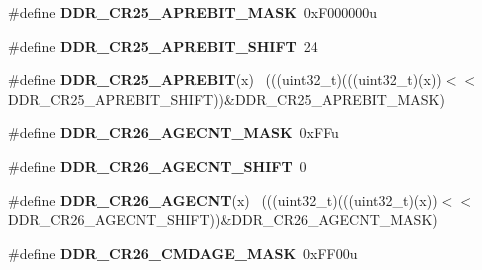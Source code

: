 \begin{DoxyCompactItemize}
\item 
\hypertarget{group___d_d_r___register___masks_gae51a88f26be259a9f86bcb1b56386788}{}\#define {\bfseries D\+D\+R\+\_\+\+C\+R25\+\_\+\+A\+P\+R\+E\+B\+I\+T\+\_\+\+M\+A\+S\+K}~0x\+F000000u\label{group___d_d_r___register___masks_gae51a88f26be259a9f86bcb1b56386788}

\item 
\hypertarget{group___d_d_r___register___masks_ga7a557a1fb1705029b7e43ccd5a9920db}{}\#define {\bfseries D\+D\+R\+\_\+\+C\+R25\+\_\+\+A\+P\+R\+E\+B\+I\+T\+\_\+\+S\+H\+I\+F\+T}~24\label{group___d_d_r___register___masks_ga7a557a1fb1705029b7e43ccd5a9920db}

\item 
\hypertarget{group___d_d_r___register___masks_ga47633c27abd8838b734e1d5cd5e342d8}{}\#define {\bfseries D\+D\+R\+\_\+\+C\+R25\+\_\+\+A\+P\+R\+E\+B\+I\+T}(x)                                        ~(((uint32\+\_\+t)(((uint32\+\_\+t)(x))$<$$<$D\+D\+R\+\_\+\+C\+R25\+\_\+\+A\+P\+R\+E\+B\+I\+T\+\_\+\+S\+H\+I\+F\+T))\&D\+D\+R\+\_\+\+C\+R25\+\_\+\+A\+P\+R\+E\+B\+I\+T\+\_\+\+M\+A\+S\+K)\label{group___d_d_r___register___masks_ga47633c27abd8838b734e1d5cd5e342d8}

\item 
\hypertarget{group___d_d_r___register___masks_gab569c7ca0823bb66ee02ad5b40c29e37}{}\#define {\bfseries D\+D\+R\+\_\+\+C\+R26\+\_\+\+A\+G\+E\+C\+N\+T\+\_\+\+M\+A\+S\+K}~0x\+F\+Fu\label{group___d_d_r___register___masks_gab569c7ca0823bb66ee02ad5b40c29e37}

\item 
\hypertarget{group___d_d_r___register___masks_gaa552705cd467d0a21c96806bdade9cba}{}\#define {\bfseries D\+D\+R\+\_\+\+C\+R26\+\_\+\+A\+G\+E\+C\+N\+T\+\_\+\+S\+H\+I\+F\+T}~0\label{group___d_d_r___register___masks_gaa552705cd467d0a21c96806bdade9cba}

\item 
\hypertarget{group___d_d_r___register___masks_gaf3b9cac000cb4127f45ee04ba57a29a2}{}\#define {\bfseries D\+D\+R\+\_\+\+C\+R26\+\_\+\+A\+G\+E\+C\+N\+T}(x)                                          ~(((uint32\+\_\+t)(((uint32\+\_\+t)(x))$<$$<$D\+D\+R\+\_\+\+C\+R26\+\_\+\+A\+G\+E\+C\+N\+T\+\_\+\+S\+H\+I\+F\+T))\&D\+D\+R\+\_\+\+C\+R26\+\_\+\+A\+G\+E\+C\+N\+T\+\_\+\+M\+A\+S\+K)\label{group___d_d_r___register___masks_gaf3b9cac000cb4127f45ee04ba57a29a2}

\item 
\hypertarget{group___d_d_r___register___masks_gafb7aeb4b9ce030c5165829df8d589316}{}\#define {\bfseries D\+D\+R\+\_\+\+C\+R26\+\_\+\+C\+M\+D\+A\+G\+E\+\_\+\+M\+A\+S\+K}~0x\+F\+F00u\label{group___d_d_r___register___masks_gafb7aeb4b9ce030c5165829df8d589316}


\end{DoxyCompactItemize}
